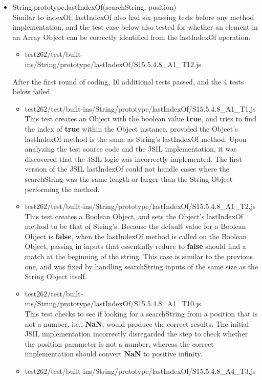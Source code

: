 \documentclass[a4paper,11pt,twoside]{report}
\begin{document}
\begin{itemize}
\item String.prototype.lastIndexOf(searchString, position) \\
Similar to indexOf, lastIndexOf also had six passing tests before any method implementation, and the test case below also tested for whether an element in an Array Object can be correctly identified from the lastIndexOf operation.
\begin{itemize}
\item test262/test/built-ins/String/prototype/lastIndexOf/S15.5.4.8\_A1\_T12.js
\end{itemize}
After the first round of coding, 10 additional tests passed, and the 4 tests below failed. 
\begin{itemize}
\item test262/test/built-ins/String/prototype/lastIndexOf/S15.5.4.8\_A1\_T1.js \\
This test creates an Object with the boolean value \textbf{true}, and tries to find the index of \textbf{true} within the Object instance, provided the Object's lastIndexOf method is the same as String's lastIndexOf method. Upon analyzing the test source code and the JSIL implementation, it was discovered that the JSIL logic was incorrectly implemented. The first version of the JSIL lastIndexOf could not handle cases where the searchString was the same length or larger than the String Object performing the method.
\item test262/test/built-ins/String/prototype/lastIndexOf/S15.5.4.8\_A1\_T2.js \\
This test creates a Boolean Object, and sets the Object's lastIndexOf method to be that of String's. Because the default value for a Boolean Object is \textbf{false}, when the lastIndexOf method is called on the Boolean Object, passing in inputs that essentially reduce to \textbf{false} should find a match at the beginning of the string. This case is similar to the previous one, and was fixed by handling searchString inputs of the same size as the String Object itself.
\item test262/test/built-ins/String/prototype/lastIndexOf/S15.5.4.8\_A1\_T10.js \\
This test checks to see if looking for a searchString from a position that is not a number, i.e., \textbf{NaN}, would produce the correct results. The initial JSIL implementation incorrectly disregarded the step to check whether the position parameter is not a number, whereas the correct implementation should convert \textbf{NaN} to positive infinity.
\item test262/test/built-ins/String/prototype/lastIndexOf/S15.5.4.8\_A4\_T3.js \\

\end{itemize}
\end{itemize}
\end{document}
